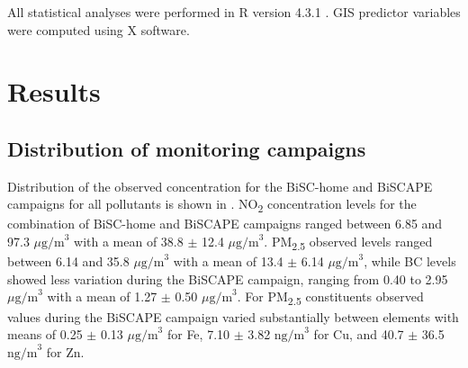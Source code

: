 \documentclass{article}
\begin{document}
All statistical analyses were performed in R version 4.3.1 \cite{Rstudio}. GIS predictor variables were computed using X software. 

\section{Results}

\subsection{Distribution of monitoring campaigns}

Distribution of the observed concentration for the BiSC-home and BiSCAPE campaigns for all pollutants is shown in . NO\textsubscript{2} concentration levels for the combination of BiSC-home and BiSCAPE campaigns ranged between 6.85 and 97.3 \(\mu \text{g/m}^3\) with a mean of  38.8 \(\pm\) 12.4 \( \mu \text{g/m}^3\). PM\textsubscript{2.5} observed levels ranged between 6.14 and 35.8 \( \mu \text{g/m}^3\) with a mean of 13.4 \(\pm\) 6.14 \(\mu \text{g/m}^3\), while BC levels showed less variation during the BiSCAPE campaign, ranging from 0.40 to 2.95 \(  \mu \text{g/m}^3\) with a mean of 1.27 \(\pm\) 0.50 \( \mu \text{g/m}^3\). For PM\textsubscript{2.5} constituents  observed values during the BiSCAPE campaign varied substantially between elements with means of 0.25 \(\pm\) 0.13 \(  \mu \text{g/m}^3\)  for  Fe,  7.10 \(\pm\) 3.82 \( \text{ng/m}^3 \) for Cu, and 40.7 \(\pm\) 36.5 \( \text{ng/m}^3 \) for Zn. \\
\end{document}
